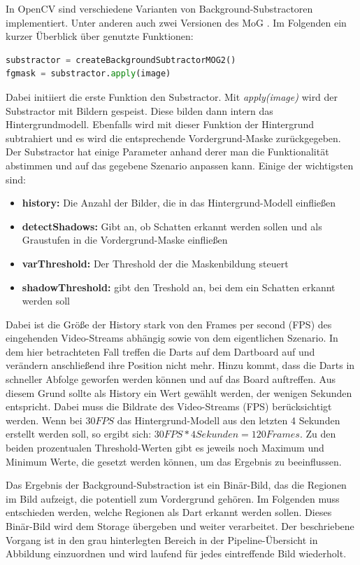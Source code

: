 In OpenCV sind verschiedene Varianten von Background-Substractoren implementiert. Unter anderen auch zwei Versionen des MoG \autocite{OpenCVBack2016}. Im Folgenden ein kurzer Überblick über genutzte Funktionen:
\begin{lstlisting}[frame=single,language=Python]
substractor = createBackgroundSubtractorMOG2()
fgmask = substractor.apply(image)
\end{lstlisting}
Dabei initiiert die erste Funktion den Substractor.
Mit \textit{apply(image)} wird der Substractor mit Bildern gespeist. Diese bilden dann intern das Hintergrundmodell. Ebenfalls wird mit dieser Funktion der Hintergrund subtrahiert und es wird die entsprechende Vordergrund-Maske zurückgegeben. 
Der Substractor hat einige Parameter anhand derer man die Funktionalität abstimmen und auf das gegebene Szenario anpassen kann. Einige der wichtigsten sind:
\begin{itemize}
	\item \textbf{history:} Die Anzahl der Bilder, die in das Hintergrund-Modell einfließen
	\item \textbf{detectShadows:} Gibt an, ob Schatten erkannt werden sollen und als Graustufen in die Vordergrund-Maske einfließen
	\item \textbf{varThreshold:} Der Threshold der die Maskenbildung steuert
	\item \textbf{shadowThreshold:} gibt den Treshold an, bei dem ein Schatten erkannt werden soll
\end{itemize}
Dabei ist die Größe der History stark von den Frames per second (FPS) des eingehenden Video-Streams abhängig sowie von dem eigentlichen Szenario. In dem hier betrachteten Fall treffen die Darts auf dem Dartboard auf und verändern anschließend ihre Position nicht mehr. Hinzu kommt, dass die Darts in schneller Abfolge geworfen werden können und auf das Board auftreffen. 
Aus diesem Grund sollte als History ein Wert gewählt werden, der wenigen Sekunden entspricht. Dabei muss die Bildrate des Video-Streams (FPS) berücksichtigt werden. Wenn bei $30FPS$ das Hintergrund-Modell aus den letzten 4 Sekunden erstellt werden soll, so ergibt sich: $30FPS * 4 Sekunden = 120 Frames$.
Zu den beiden prozentualen Threshold-Werten gibt es jeweils noch Maximum und Minimum Werte, die gesetzt werden können, um das Ergebnis zu beeinflussen.

Das Ergebnis der Background-Substraction ist ein Binär-Bild, das die Regionen im Bild aufzeigt, die potentiell zum Vordergrund gehören. Im Folgenden muss entschieden werden, welche Regionen als Dart erkannt werden sollen. Dieses Binär-Bild wird dem Storage übergeben und weiter verarbeitet. Der beschriebene Vorgang ist in den grau hinterlegten Bereich in der Pipeline-Übersicht in Abbildung einzuordnen und wird laufend für jedes eintreffende Bild wiederholt.



